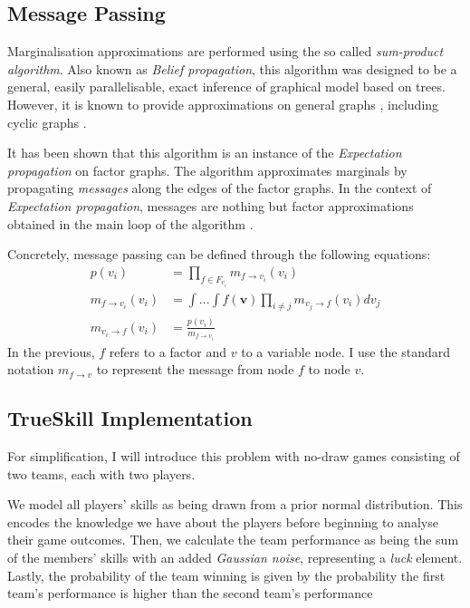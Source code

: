 \documentclass[10pt,a4]{article}
\begin{document}
\subsection{Message Passing}

Marginalisation approximations are performed using the so called \emph{sum-product algorithm}. 
Also known as \emph{Belief propagation}\cite{pearl1982reverend}, this algorithm was designed
to be a general, easily parallelisable, exact inference of graphical model
based on trees. However, it is known to provide approximations on general graphs
\cite{pearl2014probabilistic}, including cyclic graphs \cite{murphy1999loopy}.

It has been shown that this algorithm is an instance of the 
\emph{Expectation propagation}\cite{minka2001expectation} on factor graphs. 
The algorithm approximates marginals by propagating \emph{messages} along the 
edges of the factor graphs. In the context of \emph{Expectation propagation}, 
messages are nothing but factor approximations obtained in the main loop of the 
algorithm \cite{minka2001expectation}.

Concretely, message passing can be defined through the following equations:
\begin{align*}
	p(v_i) &= \prod_{f \in {F_{v_i}}}m_{f \to v_i}(v_i)  \\
	m_{f \to v_i}(v_i) &= \int...\int f(\textbf{v}) \prod_{i \neq j}m_{v_j \to f}(v_i)dv_j \\
	m_{v_i \to f}(v_i) &= \frac{p(v_i)}{m_{f \to v_i}} 
\end{align*}
In the previous, $f$ refers to a factor and $v$ to a variable node. I use the 
standard notation $m_{f \to v}$ to represent the message from node $f$ to node $v$.

\subsection{TrueSkill Implementation}

For simplification, I will introduce this problem with no-draw games consisting 
of two teams, each with two players. 

We model all players' skills as being drawn from a prior normal distribution. This encodes
the knowledge we have about the players before beginning to analyse their game 
outcomes. Then, we calculate the team performance as being the sum of the 
members' skills with an added \emph{Gaussian noise}, representing a \emph{luck}
element. Lastly, the probability of the team winning is given by the probability 
the first team's performance is higher than the second team's performance
\end{document}
